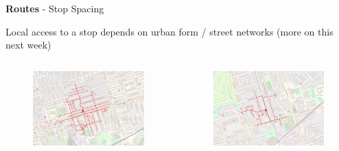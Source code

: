 \documentclass[aspectratio=169]{beamer}
\begin{document}
\begin{frame}
	
	\textbf{Routes} - Stop Spacing
	
	\vspace{2mm}
	
	Local access to a stop depends on urban form / street networks (more on this next week)
	
	\begin{columns}
		\begin{column}{0.5\textwidth}
			
			\begin{figure}
				\centering
				\includegraphics[width=1\linewidth]{images/greenwood.png}
			\end{figure}
			
			
		\end{column}
		
		\begin{column}{0.5\textwidth}
			\begin{figure}
				\centering
				\includegraphics[width=1\linewidth]{images/agincourt.png}
			\end{figure}
			
		\end{column}
		
	\end{columns}
	
	
	
\end{frame}
\end{document}
